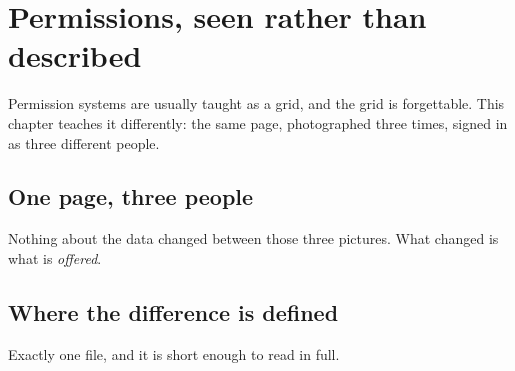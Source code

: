 \chapter{Permissions, seen rather than described}
\label{ch:roles}

Permission systems are usually taught as a grid, and the grid is forgettable.
This chapter teaches it differently: the same page, photographed three times,
signed in as three different people.

\section{One page, three people}




Nothing about the data changed between those three pictures. What changed is
what is \emph{offered}.

\section{Where the difference is defined}

Exactly one file, and it is short enough to read in full.


